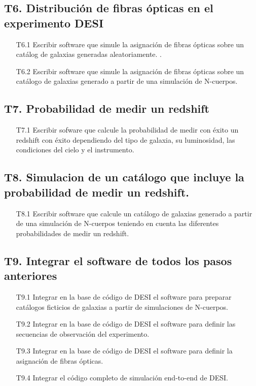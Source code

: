 \subsection*{T6. Distribuci\'on de fibras \'opticas en el experimento DESI}
\begin{itemize}
\item[T6.1] \prof Escribir software que simule la asignaci\'on de fibras
  \'opticas sobre un cat\'alog de galaxias generadas aleatoriamente.  \bob.
\item[T6.2] \prof Escribir software que simule la asignaci\'on de fibras
  \'opticas sobre un cat\'alogo de galaxias generado a partir de una
  simulaci\'on de N-cuerpos. 
\end{itemize}

\subsection*{T7. Probabilidad de medir un redshift}
\begin{itemize}
\item[T7.1] \prof Escribir sofware que calcule la probabilidad de
  medir con \'exito un redshift con \'exito dependiendo del tipo de
  galaxia, su luminosidad, las condiciones del cielo y el instrumento.
\end{itemize}

\subsection*{T8. Simulacion de un cat\'alogo que incluye la
  probabilidad de medir un redshift.}
\begin{itemize}
\item[T8.1] \prof Escribir software que calcule un cat\'alogo de galaxias
  generado a partir de una simulaci\'on de N-cuerpos teniendo en
  cuenta las diferentes probabilidades de medir un redshift.
\end{itemize}

\subsection*{T9. Integrar el software de todos los pasos anteriores}
\begin{itemize}
\item[T9.1] \gradB\prof Integrar en la base de c\'odigo de DESI el software para
  preparar cat\'alogos ficticios de galaxias a partir de simulaciones
  de N-cuerpos. 
\item[T9.2] \gradB\prof Integrar en la base de c\'odigo de DESI el software para
  definir las secuencias de observaci\'on del experimento.

\item[T9.3] \gradB\prof Integrar en la base de c\'odigo de DESI el software para
  definir la asignaci\'on de fibras \'opticas.
\item[T9.4] \gradB\prof Integrar el c\'odigo completo de simulaci\'on end-to-end
  de DESI. 
\end{itemize}

